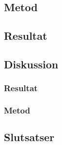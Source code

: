 \subsection{Metod}
\subsection{Resultat}
\subsection{Diskussion}
\subsubsection{Resultat}
\subsubsection{Metod}
\subsection{Slutsatser}
